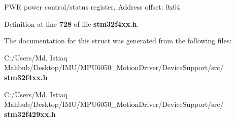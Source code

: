 P\+WR power control/status register, Address offset\+: 0x04 

Definition at line \textbf{ 728} of file \textbf{ stm32f4xx.\+h}.



The documentation for this struct was generated from the following files\+:\begin{DoxyCompactItemize}
\item 
C\+:/\+Users/\+Md. Istiaq Mahbub/\+Desktop/\+I\+M\+U/\+M\+P\+U6050\+\_\+\+Motion\+Driver/\+Device\+Support/src/\textbf{ stm32f4xx.\+h}\item 
C\+:/\+Users/\+Md. Istiaq Mahbub/\+Desktop/\+I\+M\+U/\+M\+P\+U6050\+\_\+\+Motion\+Driver/\+Device\+Support/src/\textbf{ stm32f429xx.\+h}\end{DoxyCompactItemize}
